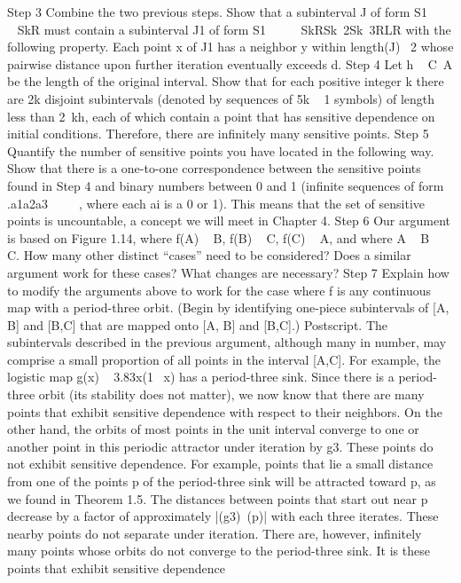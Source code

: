 \documentclass{article}
\begin{document}
Step 3 Combine the two previous steps. Show that a subinterval J of form
S1       SkR must contain a subinterval J1 of form S1       SkRSk 2Sk 3RLR with the
following property. Each point x of J1 has a neighbor y within length(J)  2 whose
pairwise distance upon further iteration eventually exceeds d.
Step 4 Let h   C A be the length of the original interval. Show that for
each positive integer k there are 2k disjoint subintervals (denoted by sequences of
5k   1 symbols) of length less than 2 kh, each of which contain a point that has
sensitive dependence on initial conditions. Therefore, there are infinitely many
sensitive points.
Step 5 Quantify the number of sensitive points you have located in the
following way. Show that there is a one-to-one correspondence between the
sensitive points found in Step 4 and binary numbers between 0 and 1 (infinite
sequences of form .a1a2a3      , where each ai is a 0 or 1). This means that the set
of sensitive points is uncountable, a concept we will meet in Chapter 4.
Step 6 Our argument is based on Figure 1.14, where f(A)   B, f(B)  
C, f(C)   A, and where A   B   C. How many other distinct “cases” need to
be considered? Does a similar argument work for these cases? What changes are
necessary?
Step 7 Explain how to modify the arguments above to work for the case
where f is any continuous map with a period-three orbit. (Begin by identifying
one-piece subintervals of [A, B] and [B,C] that are mapped onto [A, B] and
[B,C].)
Postscript. The subintervals described in the previous argument, although many in
number, may comprise a small proportion of all points in the interval [A,C]. For example,
the logistic map g(x)   3.83x(1  x) has a period-three sink. Since there is a period-three
orbit (its stability does not matter), we now know that there are many points that exhibit
sensitive dependence with respect to their neighbors. On the other hand, the orbits of most
points in the unit interval converge to one or another point in this periodic attractor under
iteration by g3. These points do not exhibit sensitive dependence. For example, points that
lie a small distance from one of the points p of the period-three sink will be attracted
toward p, as we found in Theorem 1.5. The distances between points that start out near
p decrease by a factor of approximately |(g3) (p)| with each three iterates. These nearby
points do not separate under iteration. There are, however, infinitely many points whose
orbits do not converge to the period-three sink. It is these points that exhibit sensitive
dependence
\end{document}
